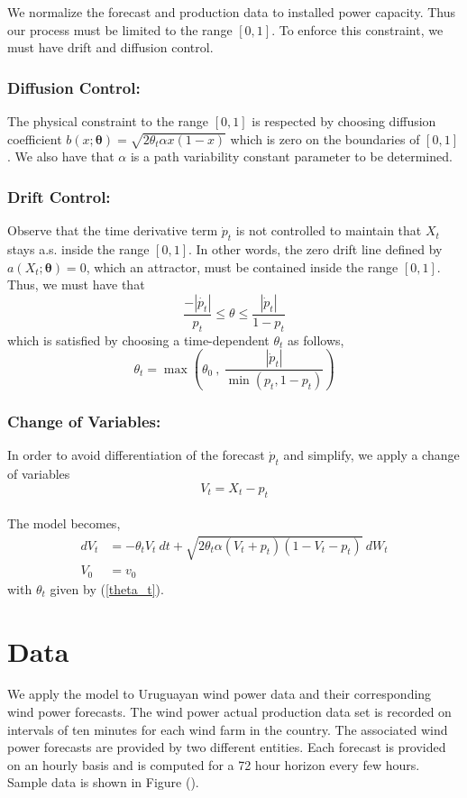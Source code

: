 \documentclass[10pt,twocolumn,letterpaper]{article}
\begin{document}
 We normalize the forecast and production data to installed power capacity. Thus our process must be limited to the range $[0,1]$. To enforce this constraint, we must have drift and diffusion control.
\subsubsection*{Diffusion Control: } The physical constraint to the range $[0,1]$ is respected  by choosing  diffusion coefficient $ b (x; \bm{\theta} )= \sqrt{2 \theta_t \alpha x (1-x)} $ which is zero on the boundaries of $[0,1]$. We also have that $\alpha$ is a path variability constant parameter to be determined.

\subsubsection*{Drift Control: }
Observe that the time derivative term $\dot{p}_t $ is not controlled to maintain that $X_t$ stays a.s.  inside the range $[0,1]$. In other words, the zero drift line defined by $a(X_t; \bm{\theta}) =0$, which an attractor, must be contained inside the range $[0,1]$. Thus, we must have that
\begin{equation}
\frac{- |\dot{p_t}|}{p_t} \leq \theta \leq \frac{|\dot{p}_t|}{1- p_t}
\end{equation}
which is satisfied  by choosing a time-dependent  $\theta_t$ as follows,
\begin{equation}
\theta_t = \max \left( \theta_0 \ , \ \frac{|\dot{p}_t|}{\min (p_t, 1-p_t)}  \right ) \label{theta_t}
\end{equation}

\subsubsection*{Change of Variables:}
In order to avoid differentiation of the forecast $\dot{p}_t$ and simplify, we apply a change of variables $$V_t = X_t - p_t$$ \\
The  model becomes,
\begin{equation}
\begin{split}
dV_t &=  - \theta_t V_t \  dt + \sqrt{2 \theta_t \alpha (V_t +p_t ) (1-V_t-p_t)} \  dW_t  \\ %
V_0 & = v_0
\end{split}\label{VtSDE}
\end{equation}
with $\theta_t$ given by (\ref{theta_t}).

\section{Data}
We apply the model to Uruguayan wind power data and their corresponding wind power forecasts. The wind power actual production data set is recorded on intervals of ten minutes for each wind farm in the country. The associated wind power forecasts are provided by two different entities. Each forecast is provided on an hourly basis and is computed for a 72 hour horizon every few hours. Sample data is shown in Figure ().
\end{document}
